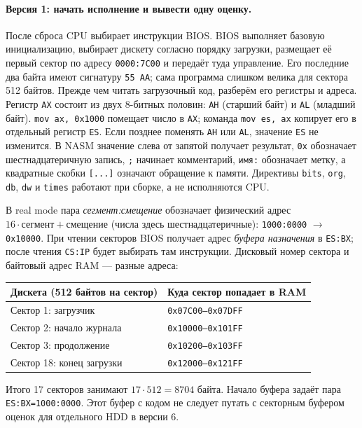 \paragraph{Версия 1: начать исполнение и вывести одну оценку.}
После сброса CPU выбирает инструкции BIOS. BIOS выполняет базовую
инициализацию, выбирает дискету согласно порядку загрузки, размещает
её первый сектор по адресу \texttt{0000:7C00} и передаёт туда управление.
Его последние два байта имеют сигнатуру \texttt{55 AA}; сама программа
слишком велика для сектора 512 байтов. Прежде чем читать загрузочный код,
разберём его регистры и адреса. Регистр \texttt{AX} состоит из двух
8-битных половин: \texttt{AH} (старший байт) и \texttt{AL} (младший байт).
\texttt{mov ax, 0x1000} помещает число в \texttt{AX}; команда
\texttt{mov es, ax} копирует его в отдельный регистр \texttt{ES}.
Если позднее поменять \texttt{AH} или \texttt{AL}, значение \texttt{ES}
не изменится. В NASM значение слева от запятой получает результат,
\texttt{0x} обозначает шестнадцатеричную запись, \texttt{;} начинает
комментарий, \texttt{имя:} обозначает метку, а квадратные скобки
\texttt{[...]} означают обращение к памяти. Директивы \texttt{bits},
\texttt{org}, \texttt{db}, \texttt{dw} и \texttt{times} работают при
сборке, а не исполняются CPU.

В real mode пара \emph{сегмент:смещение} обозначает физический адрес
$16\cdot\text{сегмент}+\text{смещение}$ (числа здесь шестнадцатеричные):
\texttt{1000:0000} $\to$ \texttt{0x10000}. При чтении секторов BIOS
получает адрес \emph{буфера назначения} в \texttt{ES:BX}; после чтения
\texttt{CS:IP} будет выбирать там инструкции. Дисковый номер сектора
и байтовый адрес RAM --- разные адреса:
\begin{center}\small
\begin{tabular}{|l|l|}\hline
Дискета (512 байтов на сектор) & Куда сектор попадает в RAM \\ \hline
Сектор 1: загрузчик & \texttt{0x07C00--0x07DFF} \\
Сектор 2: начало журнала & \texttt{0x10000--0x101FF} \\
Сектор 3: продолжение & \texttt{0x10200--0x103FF} \\
Сектор 18: конец загрузки & \texttt{0x12000--0x121FF} \\ \hline
\end{tabular}\end{center}
Итого 17 секторов занимают $17\cdot512=8704$ байта. Начало буфера
задаёт пара \texttt{ES:BX=1000:0000}. Этот буфер с кодом не следует путать
с секторным буфером оценок для отдельного HDD в версии 6.

